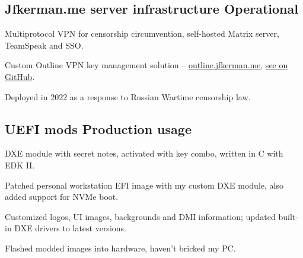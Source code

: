 \documentclass[letter,10pt]{article}
\begin{document}
\subsection{{Jfkerman.me server infrastructure \hfill Operational}}
\begin{zitemize}
\item Multiprotocol VPN for censorship circumvention, self-hosted Matrix server, TeamSpeak and SSO.
\item Custom Outline VPN key management solution -- \url{outline.jfkerman.me}, \href{https://github.com/ThePetrovich/jfkerman_outline}{see on GitHub}. 
\item Deployed in 2022 as a response to Russian Wartime censorship law.
\end{zitemize}

\subsection{{UEFI mods \hfill Production usage}}
\begin{zitemize}
\item DXE module with secret notes, activated with key combo, written in C with EDK II.
\item Patched personal workstation EFI image with my custom DXE module, also added support for NVMe boot.
\item Customized logos, UI images, backgrounds and DMI information; updated built-in DXE drivers to latest versions. 
\item Flashed modded images into hardware, haven't bricked my PC.
\end{zitemize}
\end{document}
